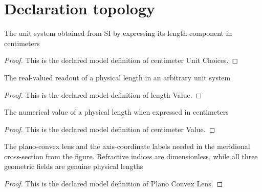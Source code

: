 \section{Declaration topology}
\begin{definition}
  \label{def:physics:phyx-mini-0028:phyxminiproblems-problemphyxmini0028-centimeterunitchoices}
  The unit system obtained from SI by expressing its length component in centimeters
\end{definition}
\begin{proof}
  This is the declared model definition of centimeter Unit Choices.
\end{proof}
\begin{definition}
  \label{def:physics:phyx-mini-0028:phyxminiproblems-problemphyxmini0028-lengthvalue}
  The real-valued readout of a physical length in an arbitrary unit system
\end{definition}
\begin{proof}
  This is the declared model definition of length Value.
\end{proof}
\begin{definition}
  \label{def:physics:phyx-mini-0028:phyxminiproblems-problemphyxmini0028-centimetervalue}
  The numerical value of a physical length when expressed in centimeters
\end{definition}
\begin{proof}
  This is the declared model definition of centimeter Value.
\end{proof}
\begin{definition}
  \label{def:physics:phyx-mini-0028:phyxminiproblems-problemphyxmini0028-planoconvexlens}
  The plano-convex lens and the axis-coordinate labels needed in the meridional cross-section from the figure. Refractive indices are dimensionless, while all three geometric fields are genuine physical lengths
\end{definition}
\begin{proof}
  This is the declared model definition of Plano Convex Lens.
\end{proof}
